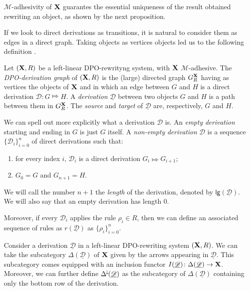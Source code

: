 \documentclass[a4paper,UKenglish,cleveref,pdftex, thm-restate,numberwithinsect]{lipics}
\newcommand{\Deltamin}{\Delta^{\hspace{-1pt}\downarrow\hspace{-1pt}}}
\def\R{\mathsf{R}}
\def\X{\textbf {\textup{X}}}
\newcommand{\dder}[1]{\mathscr{#1}}
\newcommand{\der}[1]{\underline{\dder{#1}}}
\def\gpo{\mathsf{G}^{\X}_R}
\newcommand{\lgh}[0]{\mathsf{lg}}
\begin{document}
$\mathcal{M}$-adhesivity of $\X$ guarantes the essential uniqueness of the result obtained rewriting an object, as shown by the next proposition.


If we look to direct derivations as transitions, it is natural to consider them as edges in a direct graph. Taking objects as vertices objects led us to the following definition \cite{heindel2009category}.

\begin{definition}
	Let $(\X, \R)$ be a left-linear DPO-rewrityng system, with $\X$ $\mathcal{M}$-adhesive. The \emph{DPO-derivation graph} of $(\X, \R)$ is the (large)  directed graph $\gpo$ having as vertices the objects of $\X$ and in which an edge between $G$ and $H$ is a direct derivation $\dder{D}\colon G\Mapsto H$.	A \emph{derivation} $\der{D}$ between two objects $G$ and $H$ is a path between them in $\gpo$. The \emph{source} and \emph{target} of $\der{D}$ are, respectively, $G$ and $H$.
\end{definition}

\begin{remark}
We can spell out more explicitly what  a derivation $\dder{D}$ is.  An \emph{empty derivation} starting and ending in $G$ is just $G$ itself.  A \emph{non-empty derivation} $\dder{D}$ is a sequence $\{\dder{D}_i\}_{i=0}^n$ of direct derivations such that:
\begin{enumerate}
	\item for every index $i$, $\dder{D}_i$ is a direct derivation $G_i \Mapsto G_{i+1}$;
	\item $G_0=G$ and $G_{n+1}=H$.
\end{enumerate}

We will call the number $n+1$ the \emph{length} of the derivation, denoted by $\lgh(\der{D})$. We will also say that an empty derivation has length $0$. 

Moreover,  if every $\dder{D}_i$ applies the rule $\rho_i\in R$, then we can define an associated sequence of rules as $r(\der{D})$ as $\{\rho_i\}_{i=0}^n$.
\end{remark}

\begin{remark}\label{rem:func}
	Consider a derivation $\der{D}$ in a left-linear DPO-rewriting system $(\X, \R)$. We can take the subcategory $\Delta(\der{D})$ of $\X$ given by the arrows appearing in $\der{D}$. This subcategory comes equipped with an inclusion functor $I(\der{D})\colon \Delta(\der{D})\to \X$. Moreover, we can further define $\Deltamin(\der{D})$ as the subcategory of $\Delta(\der{D})$ containing only the bottom row of the derivation.
\end{remark}
	
\end{document}
